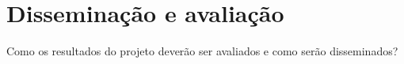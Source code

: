 \chapter{Disseminação e avaliação}\label{chp:disseminacao}

Como os resultados do projeto deverão ser avaliados e como serão disseminados?
